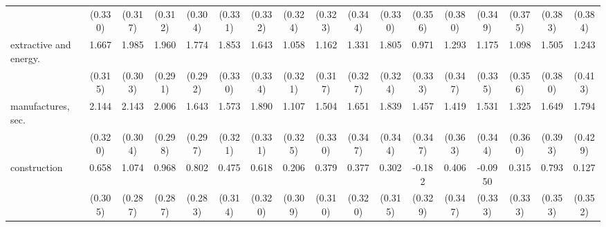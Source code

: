 {\begin{tabular}{l*{16}{c}}
                    &     (0.330)         &     (0.317)         &     (0.312)         &     (0.304)         &     (0.331)         &     (0.332)         &     (0.324)         &     (0.323)         &     (0.344)         &     (0.330)         &     (0.356)         &     (0.380)         &     (0.349)         &     (0.375)         &     (0.383)         &     (0.384)         \\
[1em]
extractive and energy.&       1.667\sym{***}&       1.985\sym{***}&       1.960\sym{***}&       1.774\sym{***}&       1.853\sym{***}&       1.643\sym{***}&       1.058\sym{***}&       1.162\sym{***}&       1.331\sym{***}&       1.805\sym{***}&       0.971\sym{**} &       1.293\sym{***}&       1.175\sym{***}&       1.098\sym{**} &       1.505\sym{***}&       1.243\sym{**} \\
                    &     (0.315)         &     (0.303)         &     (0.291)         &     (0.292)         &     (0.330)         &     (0.334)         &     (0.321)         &     (0.317)         &     (0.327)         &     (0.324)         &     (0.333)         &     (0.347)         &     (0.335)         &     (0.356)         &     (0.380)         &     (0.413)         \\
[1em]
manufactures, sec.  &       2.144\sym{***}&       2.143\sym{***}&       2.006\sym{***}&       1.643\sym{***}&       1.573\sym{***}&       1.890\sym{***}&       1.107\sym{***}&       1.504\sym{***}&       1.651\sym{***}&       1.839\sym{***}&       1.457\sym{***}&       1.419\sym{***}&       1.531\sym{***}&       1.325\sym{***}&       1.649\sym{***}&       1.794\sym{***}\\
                    &     (0.320)         &     (0.304)         &     (0.298)         &     (0.297)         &     (0.321)         &     (0.331)         &     (0.325)         &     (0.330)         &     (0.347)         &     (0.344)         &     (0.347)         &     (0.363)         &     (0.344)         &     (0.360)         &     (0.393)         &     (0.429)         \\
[1em]
construction        &       0.658\sym{*}  &       1.074\sym{***}&       0.968\sym{***}&       0.802\sym{**} &       0.475         &       0.618         &       0.206         &       0.379         &       0.377         &       0.302         &      -0.182         &       0.406         &     -0.0950         &       0.315         &       0.793\sym{*}  &       0.127         \\
                    &     (0.305)         &     (0.287)         &     (0.287)         &     (0.283)         &     (0.314)         &     (0.320)         &     (0.309)         &     (0.310)         &     (0.320)         &     (0.315)         &     (0.329)         &     (0.347)         &     (0.333)         &     (0.333)         &     (0.353)         &     (0.352)         \\

\end{tabular}}
